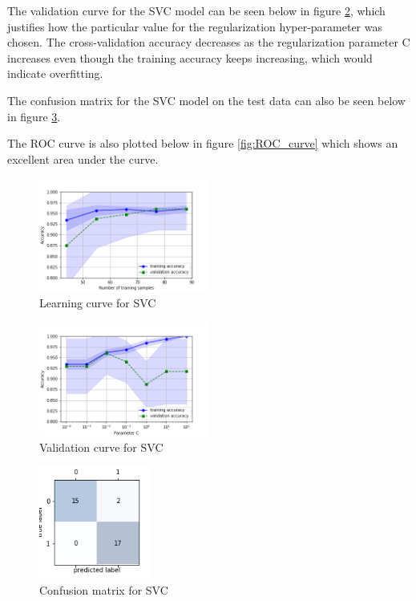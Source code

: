 \documentclass[acmtog]{acmart}
\begin{document}
The validation curve for the SVC model can be seen below in figure \ref{fig:validation_curve}, which justifies how the particular value for the regularization hyper-parameter was chosen. The cross-validation accuracy decreases as the regularization parameter C increases even though the training accuracy keeps increasing, which would indicate overfitting.

The confusion matrix for the SVC model on the test data can also be seen below in figure \ref{fig:confusion_matrix}.

The ROC curve is also plotted below in figure \ref{fig:ROC_curve} which shows an excellent area under the curve.

\begin{figure}[h]
  \includegraphics[width=0.5\textwidth]{learning_curve}
  \caption{Learning curve for SVC}
  \label{fig:learning_curve}
\end{figure}

\begin{figure}[h]
  \includegraphics[width=0.5\textwidth]{validation_curve}
  \caption{Validation curve for SVC}
  \label{fig:validation_curve}
\end{figure}

\begin{figure}[h]
  \includegraphics[width=0.33\textwidth]{confusion_matrix}
  \caption{Confusion matrix for SVC}
  \label{fig:confusion_matrix}
\end{figure}
\end{document}

